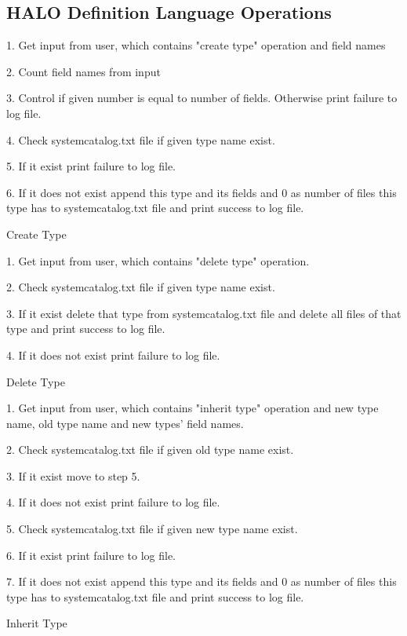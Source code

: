\documentclass{article}
\begin{document}
\subsection{HALO Definition Language Operations}

\begin{algorithm}[H]
 \item1. Get input from user, which contains "create type" operation and field names
 \item2. Count field names from input
 \item3. Control if given number is equal to number of fields. Otherwise print failure to log file.
\item 4. Check systemcatalog.txt file if given type name exist.
\item 5. If it exist print failure to log file.
\item 6. If it does not exist append this type and its fields and 0 as number of files this type has to systemcatalog.txt file and print success to log file. 
\caption{Create Type}
\end{algorithm}

\begin{algorithm}[H]
 \item 1. Get input from user, which contains "delete type" operation.
 \item 2. Check systemcatalog.txt file if given type name exist.
 \item 3. If it exist delete that type from systemcatalog.txt file and delete all files of that type and print success to log file.
\item 4. If it does not exist print failure to log file. 
\caption{Delete Type}
\end{algorithm}

\begin{algorithm}[H]
 \item 1. Get input from user, which contains "inherit type" operation and new type name, old type name and new types' field names.
 \item 2. Check systemcatalog.txt file if given old type name exist.
 \item 3. If it exist move to step 5.
 \item 4. If it does not exist print failure to log file.
 \item 5. Check systemcatalog.txt file if given new type name exist.
 \item 6. If it exist print failure to log file.
\item 7. If it does not exist append this type and its fields and 0 as number of files this type has to systemcatalog.txt file and print success to log file. 
\caption{Inherit Type}
\end{algorithm}
\end{document}
